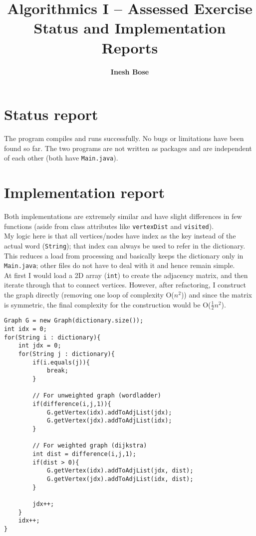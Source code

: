 \documentclass{article}
\title{Algorithmics I --  Assessed Exercise\\ \vspace{4mm} 
Status and Implementation Reports}
\author{\bf Inesh Bose}
\date{}
\newcommand{\code}[1]{\texttt{#1}}
\begin{document}

\maketitle

\vspace{0.5cm}

\section*{Status report}

The program compiles and runs successfully. No bugs or limitations have been found so far. The two programs are not written as packages and are independent of each other (both have \code{Main.java}).

\vspace{0.5cm}

\section*{Implementation report}
Both implementations are extremely similar and have slight differences in few functions (aside from class attributes like \code{vertexDist} and \code{visited}). \\

\noindent My logic here is that all vertices/nodes have index as the key instead of the actual word (\code{String}); that index can always be used to refer in the dictionary. This reduces a load from processing and basically keeps the dictionary only in \code{Main.java}; other files do not have to deal with it and hence remain simple. \\

\noindent At first I would load a 2D array (\code{int}) to create the adjacency matrix, and then iterate through that to connect vertices. However, after refactoring, I construct the graph directly (removing one loop of complexity O($n^{2}$)) and since the matrix is symmetric, the final complexity for the construction would be O($\frac{1}{2}n^{2}$).

\newpage

\begin{verbatim}
Graph G = new Graph(dictionary.size());
int idx = 0;
for(String i : dictionary){
	int jdx = 0;
	for(String j : dictionary){
		if(i.equals(j)){
			break;
		}
		
		// For unweighted graph (wordladder)
		if(difference(i,j,1)){
			G.getVertex(idx).addToAdjList(jdx);
			G.getVertex(jdx).addToAdjList(idx);
		}
		
		// For weighted graph (dijkstra)
		int dist = difference(i,j,1);
		if(dist > 0){
			G.getVertex(idx).addToAdjList(jdx, dist);
			G.getVertex(jdx).addToAdjList(idx, dist);
		}
		
		jdx++;
	}
	idx++;
}
\end{verbatim}
\end{document}
